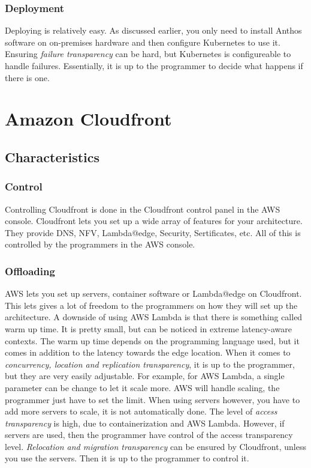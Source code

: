 \subsubsection{Deployment}
Deploying is relatively easy. As discussed earlier, you only need to install Anthos software on on-premises hardware and then configure Kubernetes to use it. Ensuring \textit{failure transparency} can be hard, but Kubernetes is configureable to handle failures. Essentially, it is up to the programmer to decide what happens if there is one.













\section{Amazon Cloudfront}
\subsection{Characteristics}
\subsubsection{Control}
Controlling Cloudfront is done in the Cloudfront control panel in the AWS console. Cloudfront lets you set up a wide array of features for your architecture. They provide DNS, NFV, Lambda@edge, Security, Sertificates, etc. All of this is controlled by the programmers in the AWS console.  


\subsubsection{Offloading}
AWS lets you set up servers, container software or Lambda@edge on Cloudfront. This lets gives a lot of freedom to the programmers on how they will set up the architecture. A downside of using AWS Lambda is that there is something called warm up time. It is pretty small, but can be noticed in extreme latency-aware contexts. The warm up time depends on the programming language used, but it comes in addition to the latency towards the edge location. When it comes to \textit{concurrency, location and replication transparency}, it is up to the programmer, but they are very easily adjustable. For example, for AWS Lambda, a single parameter can be change to let it scale more. AWS will handle scaling, the programmer just have to set the limit. When using servers however, you have to add more servers to scale, it is not automatically done. The level of \textit{access transparency} is high, due to containerization and AWS Lambda. However, if servers are used, then the programmer have control of the access transparency level. \textit{Relocation and migration transparency} can be ensured by Cloudfront, unless you use the servers. Then it is up to the programmer to control it. 


